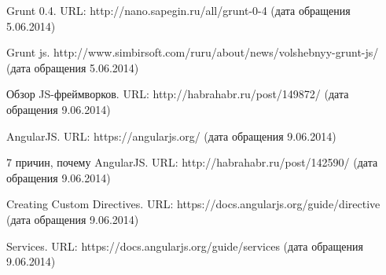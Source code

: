 \begin{thebibliography}{99}
	Grunt 0.4. URL: http://nano.sapegin.ru/all/grunt-0-4 (дата обращения 5.06.2014)

	Grunt js. http://www.simbirsoft.com/ruru/about/news/volshebnyy-grunt-js/ (дата обращения 5.06.2014)


	Обзор JS-фреймворков. URL: http://habrahabr.ru/post/149872/ (дата обращения 9.06.2014)

	AngularJS. URL: https://angularjs.org/ (дата обращения 9.06.2014)

	7 причин, почему AngularJS. URL: http://habrahabr.ru/post/142590/ (дата обращения 9.06.2014)

	Creating Custom Directives. URL: https://docs.angularjs.org/guide/directive (дата обращения 9.06.2014)

	Services. URL: https://docs.angularjs.org/guide/services (дата обращения 9.06.2014)
\end{thebibliography}